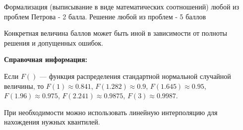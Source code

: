\documentclass[addpoints, answers]{exam} %
\begin{document}
\begin{questions}
\begin{parts}
\begin{solution}
Формализация (выписывание в виде математических соотношений) любой из проблем Петрова - 2 балла. Решение любой из проблем - 5 баллов

Конкретная величина баллов может быть иной в зависимости от полноты решения и допущенных ошибок.
\end{solution}

\end{parts}



\end{questions}
\textbf{Справочная информация:}

\vspace{6pt}

Если $F()$ --- функция распределения стандартной нормальной случайной величины, то $F(1)\approx 0.841$, $F(1.282)\approx 0.9$, $F(1.645)\approx 0.95$, $F(1.96)\approx 0.975$, $F(2.241)\approx 0.9875$, $F(3)\approx 0.9987$.

При необходимости можно использовать линейную интерполяцию для нахождения нужных квантилей.
\end{document}
